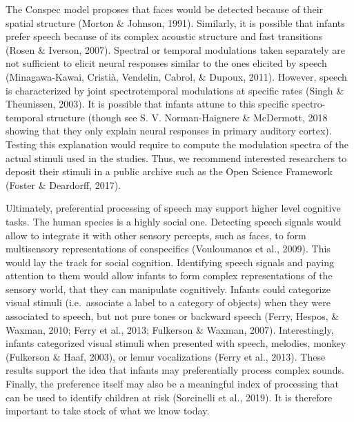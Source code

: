 \documentclass[man]{apa6}
\begin{document}
The Conspec model proposes that faces would be detected because of their
spatial structure (Morton \& Johnson, 1991). Similarly, it is possible
that infants prefer speech because of its complex acoustic structure and
fast transitions (Rosen \& Iverson, 2007). Spectral or temporal
modulations taken separately are not sufficient to elicit neural
responses similar to the ones elicited by speech (Minagawa-Kawai,
Cristià, Vendelin, Cabrol, \& Dupoux, 2011). However, speech is
characterized by joint spectrotemporal modulations at specific rates
(Singh \& Theunissen, 2003). It is possible that infants attune to this
specific spectro-temporal structure (though see S. V. Norman-Haignere \&
McDermott, 2018 showing that they only explain neural responses in
primary auditory cortex). Testing this explanation would require to
compute the modulation spectra of the actual stimuli used in the
studies. Thus, we recommend interested researchers to deposit their
stimuli in a public archive such as the Open Science Framework (Foster
\& Deardorff, 2017).

Ultimately, preferential processing of speech may support higher level
cognitive tasks. The human species is a highly social one. Detecting
speech signals would allow to integrate it with other sensory percepts,
such as faces, to form multisensory representations of conspecifics
(Vouloumanos et al., 2009). This would lay the track for social
cognition. Identifying speech signals and paying attention to them would
allow infants to form complex representations of the sensory world, that
they can manipulate cognitively. Infants could categorize visual stimuli
(i.e.~associate a label to a category of objects) when they were
associated to speech, but not pure tones or backward speech (Ferry,
Hespos, \& Waxman, 2010; Ferry et al., 2013; Fulkerson \& Waxman, 2007).
Interestingly, infants categorized visual stimuli when presented with
speech, melodies, monkey (Fulkerson \& Haaf, 2003), or lemur
vocalizations (Ferry et al., 2013). These results support the idea that
infants may preferentially process complex sounds. Finally, the
preference itself may also be a meaningful index of processing that can
be used to identify children at risk (Sorcinelli et al., 2019). It is
therefore important to take stock of what we know today.
\end{document}
